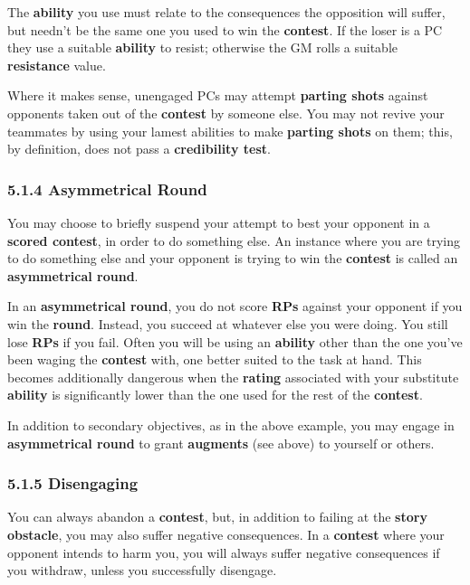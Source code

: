\documentclass[
]{article}
\begin{document}
The \textbf{ability} you use must relate to the consequences the
opposition will suffer, but needn't be the same one you used to win the
\textbf{contest}. If the loser is a PC they use a suitable
\textbf{ability} to resist; otherwise the GM rolls a suitable
\textbf{resistance} value.

Where it makes sense, unengaged PCs may attempt \textbf{parting shots}
against opponents taken out of the \textbf{contest} by someone else. You
may not revive your teammates by using your lamest abilities to make
\textbf{parting shots} on them; this, by definition, does not pass a
\textbf{credibility test}.

\hypertarget{asymmetrical-round}{%
\subsubsection{5.1.4 Asymmetrical Round}\label{asymmetrical-round}}

You may choose to briefly suspend your attempt to best your opponent in
a \textbf{scored contest}, in order to do something else. An instance
where you are trying to do something else and your opponent is trying to
win the \textbf{contest} is called an \textbf{asymmetrical round}.

In an \textbf{asymmetrical round}, you do not score \textbf{RPs} against
your opponent if you win the \textbf{round}. Instead, you succeed at
whatever else you were doing. You still lose \textbf{RPs} if you fail.
Often you will be using an \textbf{ability} other than the one you've
been waging the \textbf{contest} with, one better suited to the task at
hand. This becomes additionally dangerous when the \textbf{rating}
associated with your substitute \textbf{ability} is significantly lower
than the one used for the rest of the \textbf{contest}.

In addition to secondary objectives, as in the above example, you may
engage in \textbf{asymmetrical round} to grant \textbf{augments} (see
above) to yourself or others.

\hypertarget{disengaging}{%
\subsubsection{5.1.5 Disengaging}\label{disengaging}}

You can always abandon a \textbf{contest}, but, in addition to failing
at the \textbf{story obstacle}, you may also suffer negative
consequences. In a \textbf{contest} where your opponent intends to harm
you, you will always suffer negative consequences if you withdraw,
unless you successfully disengage.
\end{document}
